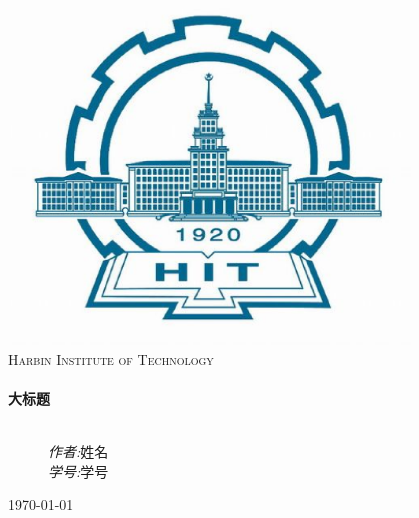 \documentclass[a4paper,11pt]{ctexart}
\begin{document}
\begin{titlepage}
\begin{center}

\includegraphics[width=0.8\textwidth]{./images/HIT.eps}\\[1cm]
\textsc{\LARGE Harbin Institute of Technology}\\[1.5cm]

\hrulefill \\[0.4cm]
{ \huge \bfseries 大标题}\\[0.4cm]
\hrulefill \\[1.5cm]

\begin{figure}[htb]
    \begin{minipage}[b]{0.5\textwidth}
    \begin{flushleft} \large%

    \end{flushleft}
    \label{fig:left}
  \end{minipage}%
  \begin{minipage}[b]{0.5\textwidth}
    \centering
    \begin{flushright} \large%
    \emph{作者:}姓名\\
    \emph{学号:}学号
    \end{flushright}
    \label{fig:right}
  \end{minipage}
\end{figure}

\vfill
{\large \today}%
\end{center}
\end{titlepage}
\end{document}

